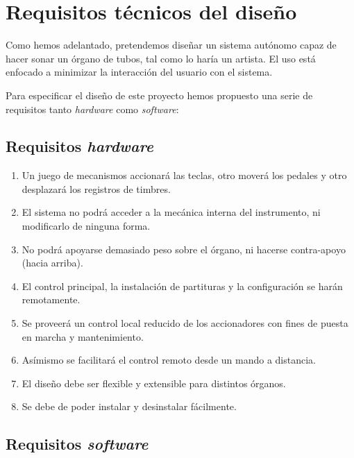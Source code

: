 \chapter{Requisitos técnicos del diseño}
\label{cap:capitulo_2}

Como hemos adelantado, pretendemos diseñar un sistema autónomo capaz de hacer sonar un órgano de tubos, tal como lo haría un artista. El uso está enfocado a minimizar la interacción del usuario con el sistema. 

Para especificar el diseño de este proyecto hemos propuesto una serie de requisitos tanto \textit{hardware} como \textit{software}:

\section{Requisitos \textit{hardware}}

\begin{enumerate}
	
	\item Un juego de mecanismos accionará las teclas, otro moverá los pedales y otro desplazará los registros de timbres.
	
	\item El sistema no podrá acceder a la mecánica interna del instrumento, ni modificarlo de ninguna forma.
	
	\item No podrá apoyarse demasiado peso sobre el órgano, ni hacerse contra-apoyo (hacia arriba).
	
	\item El control principal, la instalación de partituras y la configuración se harán remotamente.
	
	\item Se proveerá un control local reducido de los accionadores con fines de puesta en marcha y mantenimiento.
	
	\item Asímismo se facilitará el control remoto desde un mando a distancia.
	
	\item El diseño debe ser flexible y extensible para distintos órganos.
	
	\item Se debe de poder instalar y desinstalar fácilmente.
	
\end{enumerate}

\section{Requisitos \textit{software}}

